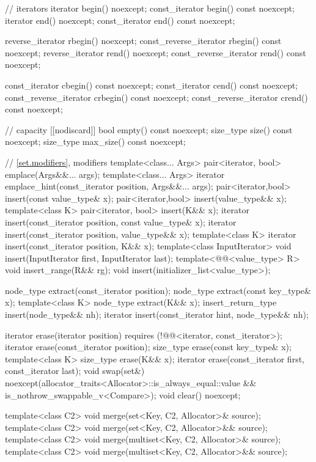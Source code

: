 \begin{codeblock}
{{    // iterators
    iterator               begin() noexcept;
    const_iterator         begin() const noexcept;
    iterator               end() noexcept;
    const_iterator         end() const noexcept;

    reverse_iterator       rbegin() noexcept;
    const_reverse_iterator rbegin() const noexcept;
    reverse_iterator       rend() noexcept;
    const_reverse_iterator rend() const noexcept;

    const_iterator         cbegin() const noexcept;
    const_iterator         cend() const noexcept;
    const_reverse_iterator crbegin() const noexcept;
    const_reverse_iterator crend() const noexcept;

    // capacity
    [[nodiscard]] bool empty() const noexcept;
    size_type size() const noexcept;
    size_type max_size() const noexcept;

    // \ref{set.modifiers}, modifiers
    template<class... Args> pair<iterator, bool> emplace(Args&&... args);
    template<class... Args> iterator emplace_hint(const_iterator position, Args&&... args);
    pair<iterator,bool> insert(const value_type& x);
    pair<iterator,bool> insert(value_type&& x);
    template<class K> pair<iterator, bool> insert(K&& x);
    iterator insert(const_iterator position, const value_type& x);
    iterator insert(const_iterator position, value_type&& x);
    template<class K> iterator insert(const_iterator position, K&& x);
    template<class InputIterator>
      void insert(InputIterator first, InputIterator last);
    template<@@<value_type> R>
      void insert_range(R&& rg);
    void insert(initializer_list<value_type>);

    node_type extract(const_iterator position);
    node_type extract(const key_type& x);
    template<class K> node_type extract(K&& x);
    insert_return_type insert(node_type&& nh);
    iterator           insert(const_iterator hint, node_type&& nh);

    iterator  erase(iterator position)
      requires (!@@<iterator, const_iterator>);
    iterator  erase(const_iterator position);
    size_type erase(const key_type& x);
    template<class K> size_type erase(K&& x);
    iterator  erase(const_iterator first, const_iterator last);
    void      swap(set&)
      noexcept(allocator_traits<Allocator>::is_always_equal::value &&
               is_nothrow_swappable_v<Compare>);
    void      clear() noexcept;

    template<class C2>
      void merge(set<Key, C2, Allocator>& source);
    template<class C2>
      void merge(set<Key, C2, Allocator>&& source);
    template<class C2>
      void merge(multiset<Key, C2, Allocator>& source);
    template<class C2>
      void merge(multiset<Key, C2, Allocator>&& source);

}}
\end{codeblock}
